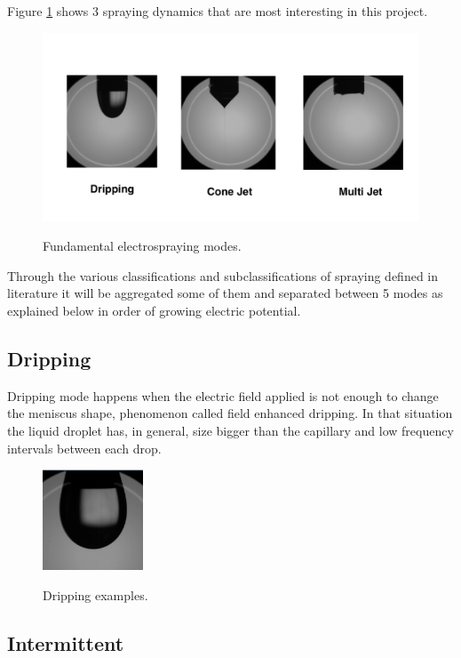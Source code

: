 Figure \ref{fig:spraying_modes} shows 3 spraying dynamics that are most interesting in this project. 


  \begin{figure}[H]
      \center
      \includegraphics[width=15cm]{Figuras/spraying_modes.png}
      \label{fig:spraying_modes}
      \caption{Fundamental electrospraying modes.}
  \end{figure}


Through the various classifications and subclassifications of spraying defined in literature it will be aggregated some of them and separated between 5 modes as explained below in order of growing electric potential.

\subsection{Dripping}
\label{subsec:dripping}

Dripping mode happens when the electric field applied is not enough to change the meniscus shape, phenomenon called field enhanced dripping.
In that situation the liquid droplet has, in general, size bigger than the capillary and low frequency intervals between each drop.

\begin{figure}[H]
  \center
  \includegraphics[width=3cm]{Figuras/19:03/drip_example.png}
  \label{fig:drip_example}
  \caption{Dripping examples.}
\end{figure}

\subsection{Intermittent}
\label{subsec:Intermittent}

